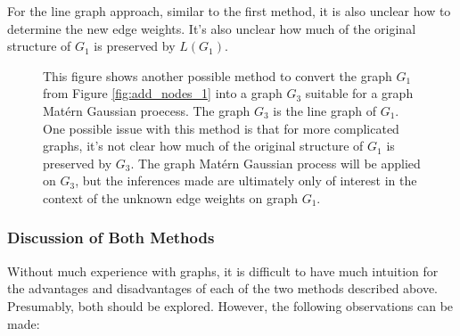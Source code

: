 For the line graph approach, similar to the first method, it is also unclear how to determine the new edge weights. It's also unclear how much of the original structure of $G_1$ is preserved by $L(G_1)$.

\begin{figure}
    \begin{center}
    \end{center}
    \caption{This figure shows another possible method to convert the graph $G_1$ from Figure \ref{fig:add_nodes_1} into a graph $G_3$ suitable for a graph Mat\'{e}rn Gaussian proecess. The graph $G_3$ is the line graph of $G_1$. One possible issue with this method is that for more complicated graphs, it's not clear how much of the original structure of $G_1$ is preserved by $G_3$. The graph Mat\'{e}rn Gaussian process will be applied on $G_3$, but the inferences made are ultimately only of interest in the context of the unknown edge weights on graph $G_1$.}
    \label{fig:add_nodes_3}
\end{figure}

\subsubsection{Discussion of Both Methods}

Without much experience with graphs, it is difficult to have much intuition for the advantages and disadvantages of each of the two methods described above. Presumably, both should be explored. However, the following observations can be made:


